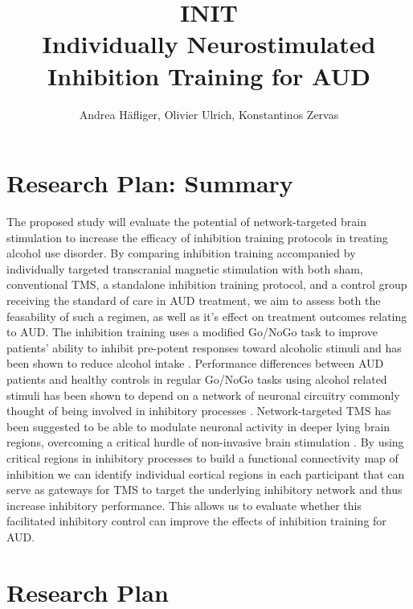 \documentclass[12pt]{article}
\title{%
	INIT \\
	\large Individually Neurostimulated Inhibition Training for AUD}
\author{Andrea Häfliger, Olivier Ulrich, Konstantinos Zervas}
\begin{document}
\pagestyle{fancy}
\thispagestyle{empty}

\maketitle
\newpage
\tableofcontents
\newpage

\section{Research Plan: Summary}

The proposed study will evaluate the potential of network-targeted brain stimulation to increase the efficacy of inhibition training protocols in treating alcohol use disorder. By comparing inhibition training accompanied by individually targeted transcranial magnetic stimulation with both sham, conventional TMS, a standalone inhibition training protocol, and a control group receiving the standard of care in AUD treatment, we aim to assess both the feasability of such a regimen, as well as it's effect on treatment outcomes relating to AUD. The inhibition training uses a modified Go/NoGo task to improve patients' ability to inhibit pre-potent responses toward alcoholic stimuli and has been shown to reduce alcohol intake \parencite{houbenBeerNogoLearning2012}. Performance differences between AUD patients and healthy controls in regular Go/NoGo tasks using alcohol related stimuli has been shown to depend on a network of neuronal circuitry commonly thought of being involved in inhibitory processes \parencite{czaplaAlcoholdependentPatientsShow2017,volkowAddictionScienceUncovering2014,simmondsMetaanalysisGoNogo2008,luijtenSystematicReviewERP2014}. Network-targeted TMS has been suggested to be able to modulate neuronal activity in deeper lying brain regions, overcoming a critical hurdle of non-invasive brain stimulation \parencite{momiCognitiveEnhancementNetworkTargeted2020}. By using critical regions in inhibitory processes to build a functional connectivity map of inhibition we can identify individual cortical regions in each participant that can serve as gateways for TMS to target the underlying inhibitory network and thus increase inhibitory performance. This allows us to evaluate whether this facilitated inhibitory control can improve the effects of inhibition training for AUD.

\section{Research Plan}
\end{document}
